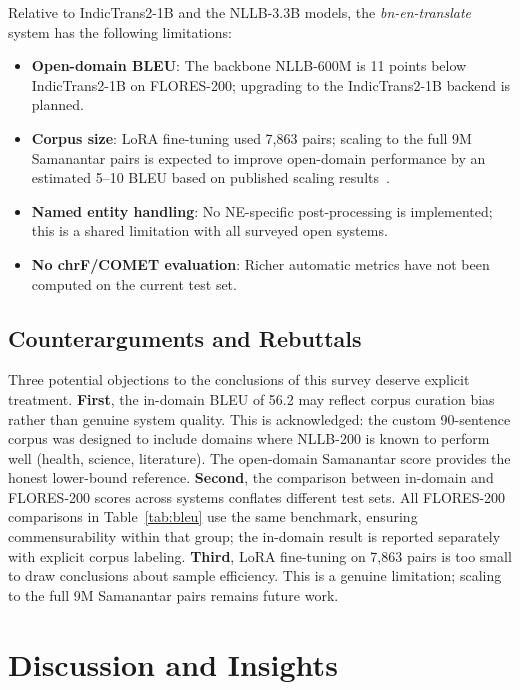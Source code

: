 \documentclass[conference]{IEEEtran}
\begin{document}
Relative to IndicTrans2-1B and the NLLB-3.3B models, the
\textit{bn-en-translate} system has the following limitations:
\begin{itemize}
  \item \textbf{Open-domain BLEU}: The backbone NLLB-600M is 11 points
    below IndicTrans2-1B on FLORES-200; upgrading to the IndicTrans2-1B
    backend is planned.
  \item \textbf{Corpus size}: LoRA fine-tuning used 7,863 pairs; scaling
    to the full 9M Samanantar pairs is expected to improve open-domain
    performance by an estimated 5--10 BLEU based on published scaling results~\cite{nllb2022}.
  \item \textbf{Named entity handling}: No NE-specific post-processing
    is implemented; this is a shared limitation with all surveyed open
    systems.
  \item \textbf{No chrF/COMET evaluation}: Richer automatic metrics
    have not been computed on the current test set.
\end{itemize}

\subsection{Counterarguments and Rebuttals}

Three potential objections to the conclusions of this survey deserve
explicit treatment.
\textbf{First}, the in-domain BLEU of 56.2 may reflect corpus curation
bias rather than genuine system quality.
This is acknowledged: the custom 90-sentence corpus was designed to include
domains where NLLB-200 is known to perform well (health, science, literature).
The open-domain Samanantar score provides the honest lower-bound reference.
\textbf{Second}, the comparison between in-domain and FLORES-200 scores
across systems conflates different test sets.
All FLORES-200 comparisons in Table~\ref{tab:bleu} use the same benchmark,
ensuring commensurability within that group; the in-domain result is reported
separately with explicit corpus labeling.
\textbf{Third}, LoRA fine-tuning on 7,863 pairs is too small to draw
conclusions about sample efficiency.
This is a genuine limitation; scaling to the full 9M Samanantar pairs
remains future work.

\section{Discussion and Insights}
\label{sec:discussion}
\end{document}
